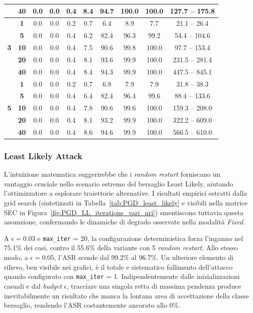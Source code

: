 \documentclass[a4paper, 12pt]{article}
\begin{document}
\begin{table}[h]
{\begin{tabular}{cc ccccccc c}
         & \textbf{40} & 0.0 & 0.0 & 0.4 & 8.4 & 94.7 & 100.0 & 100.0 & 127.7 -- 175.8 \\
        \midrule
        \multirow{5}{*}{\textbf{3}} 
         & \textbf{1}  & 0.0 & 0.0 & 0.2 & 0.7 & 6.4 & 8.9 & 7.7 & 21.1 -- 26.4 \\
         & \textbf{5}  & 0.0 & 0.0 & 0.4 & 6.2 & 82.4 & 96.3 & 99.2 & 54.4 -- 104.6 \\
         & \textbf{10} & 0.0 & 0.0 & 0.4 & 7.5 & 90.6 & 99.8 & 100.0 & 97.7 -- 153.4 \\
         & \textbf{20} & 0.0 & 0.0 & 0.4 & 8.1 & 93.6 & 99.9 & 100.0 & 231.5 -- 281.4 \\
         & \textbf{40} & 0.0 & 0.0 & 0.4 & 8.4 & 94.3 & 99.9 & 100.0 & 447.5 -- 845.1 \\
        \midrule
        \multirow{5}{*}{\textbf{5}} 
         & \textbf{1}  & 0.0 & 0.0 & 0.2 & 0.7 & 6.8 & 7.9 & 7.9 & 31.8 -- 38.3 \\
         & \textbf{5}  & 0.0 & 0.0 & 0.4 & 6.4 & 82.4 & 96.4 & 99.6 & 88.4 -- 133.6 \\
         & \textbf{10} & 0.0 & 0.0 & 0.4 & 7.8 & 90.6 & 99.6 & 100.0 & 159.3 -- 208.0 \\
         & \textbf{20} & 0.0 & 0.0 & 0.4 & 8.1 & 93.2 & 99.9 & 100.0 & 322.2 -- 609.0 \\
         & \textbf{40} & 0.0 & 0.0 & 0.4 & 8.6 & 94.6 & 99.9 & 100.0 & 566.5 -- 610.0 \\
        \bottomrule
    \end{tabular}
    }
\end{table}

\subsubsection*{Least Likely Attack}
L'intuizione matematica suggerirebbe che i \textit{random restart} forniscano un vantaggio cruciale nello scenario 
estremo del bersaglio Least Likely, aiutando l'ottimizzatore a esplorare traiettorie alternative. I risultati
empirici estratti dalla grid search (sintetizzati in Tabella~\ref{tab:PGD_least_likely} e visibili nella matrice SEC 
in Figura~\ref{fig:PGD_LL_iterations_vari_nri}) smentiscono tuttavia questa assunzione, confermando le dinamiche di 
degrado osservate nella modalità \textit{Fixed}. 

A $\epsilon = 0.03$ e \texttt{max\_iter} = 20, la configurazione deterministica forza l'inganno nel 75.1\% dei casi, contro il 55.6\% della variante con 5 \textit{random restart}. Allo stesso modo, a $\epsilon = 0.05$, l'ASR scende dal 99.2\% al 96.7\%.
Un ulteriore elemento di rilievo, ben visibile nei grafici, è il totale e sistematico fallimento dell'attacco quando configurato con \texttt{max\_iter} = 1. Indipendentemente dalle inizializzazioni casuali e dal \textit{budget} $\epsilon$, tracciare una singola retta di massima pendenza produce inevitabilmente un risultato che manca la lontana area di accettazione della classe bersaglio, rendendo l'ASR costantemente ancorato allo 0\%.
\end{document}
